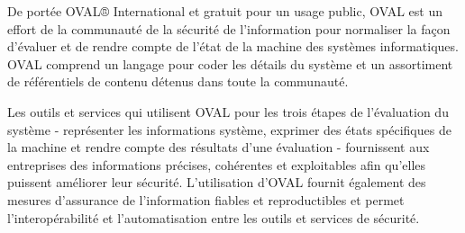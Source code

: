 De portée OVAL® International et gratuit pour un usage public, OVAL est un effort de la communauté de la sécurité de l'information pour normaliser la façon d'évaluer et de rendre compte de l'état de la machine des systèmes informatiques. OVAL comprend un langage pour coder les détails du système et un assortiment de référentiels de contenu détenus dans toute la communauté.

Les outils et services qui utilisent OVAL pour les trois étapes de l'évaluation du système - représenter les informations système, exprimer des états spécifiques de la machine et rendre compte des résultats d'une évaluation - fournissent aux entreprises des informations précises, cohérentes et exploitables afin qu'elles puissent améliorer leur sécurité. L'utilisation d'OVAL fournit également des mesures d'assurance de l'information fiables et reproductibles et permet l'interopérabilité et l'automatisation entre les outils et services de sécurité.